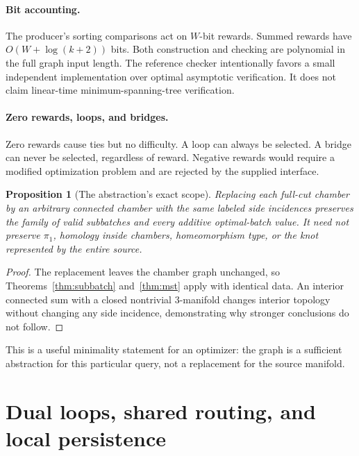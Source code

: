 \documentclass[11pt]{article}
\newtheorem{proposition}[theorem]{Proposition}
\theoremstyle{definition}
\begin{document}
\paragraph{Bit accounting.} The producer's sorting comparisons act on $W$-bit rewards. Summed rewards have $O(W+\log(k+2))$ bits. Both construction and checking are polynomial in the full graph input length. The reference checker intentionally favors a small independent implementation over optimal asymptotic verification. It does not claim linear-time minimum-spanning-tree verification.

\paragraph{Zero rewards, loops, and bridges.} Zero rewards cause ties but no difficulty. A loop can always be selected. A bridge can never be selected, regardless of reward. Negative rewards would require a modified optimization problem and are rejected by the supplied interface.

\begin{proposition}[The abstraction's exact scope]\label{prop:replacement}
Replacing each full-cut chamber by an arbitrary connected chamber with the same labeled side incidences preserves the family of valid subbatches and every additive optimal-batch value. It need not preserve $\pi_1$, homology inside chambers, homeomorphism type, or the knot represented by the entire source.
\end{proposition}
\begin{proof}
The replacement leaves the chamber graph unchanged, so Theorems~\ref{thm:subbatch} and~\ref{thm:mst} apply with identical data. An interior connected sum with a closed nontrivial $3$-manifold changes interior topology without changing any side incidence, demonstrating why stronger conclusions do not follow.
\end{proof}
This is a useful minimality statement for an optimizer: the graph is a sufficient abstraction for this particular query, not a replacement for the source manifold.

\section{Dual loops, shared routing, and local persistence}\label{sec:persistence}
\end{document}
